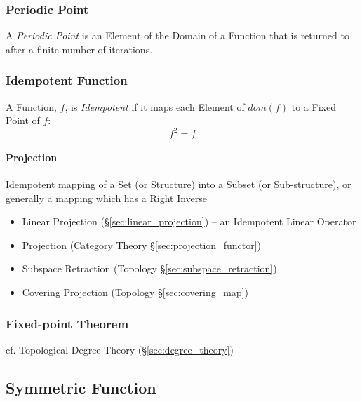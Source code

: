 \subsubsection{Periodic Point}\label{sec:periodic_point}

A \emph{Periodic Point} is an Element of the Domain of a Function that
is returned to after a finite number of iterations.



\subsubsection{Idempotent Function}\label{sec:idempotent}

A Function, $f$, is \emph{Idempotent} if it maps each Element of
$dom(f)$ to a Fixed Point of $f$:
\[
  f^2 = f
\]



\paragraph{Projection}\label{sec:projection}\hfill

Idempotent mapping of a Set (or Structure) into a Subset (or Sub-structure), or
generally a mapping which has a Right Inverse

\begin{itemize}
  \item Linear Projection (\S\ref{sec:linear_projection}) -- an Idempotent
    Linear Operator
  \item Projection (Category Theory \S\ref{sec:projection_functor})
  \item Subspace Retraction (Topology \S\ref{sec:subspace_retraction})
  \item Covering Projection (Topology \S\ref{sec:covering_map})
\end{itemize}



\subsubsection{Fixed-point Theorem}\label{sec:fixedpoint_theorem}

cf. Topological Degree Theory (\S\ref{sec:degree_theory})



\subsection{Symmetric Function}\label{sec:symmetric_function}

